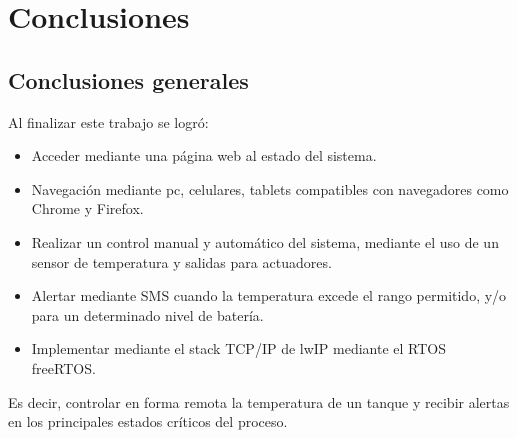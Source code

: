 
\chapter{Conclusiones} %

\label{Chapter5} %




\section{Conclusiones generales }


Al finalizar este trabajo se logró:
  \begin{itemize}
    \item Acceder mediante una página web al estado del sistema.
    \item Navegación mediante pc, celulares, tablets compatibles con navegadores como Chrome y Firefox.
    \item Realizar un control manual y automático del sistema, mediante el uso de un sensor de temperatura y salidas para actuadores. 
    \item Alertar mediante SMS cuando la temperatura excede el rango permitido, y/o para un determinado nivel de batería.
    \item Implementar mediante el stack TCP/IP de lwIP mediante el RTOS freeRTOS. 
   \end{itemize} 

Es decir, controlar en forma remota la temperatura de un tanque y recibir alertas en los principales estados críticos del proceso.



